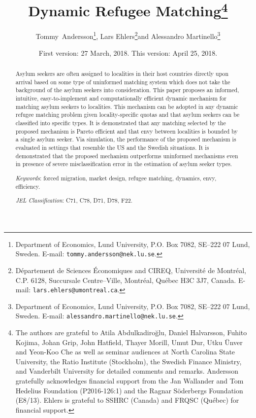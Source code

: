 \documentclass[12pt,fleqn]{article}
\begin{document}
\title{\textbf{Dynamic Refugee Matching}\footnote{The authors are grateful to Atila Abdulkadiro\u{g}lu, Daniel Halvarsson, Fuhito Kojima, Johan Grip, John Hatfield, Thayer Morill, Umut Dur, Utku \"{U}nver and Yeon-Koo Che as well as seminar audiences at North Carolina State University, the Ratio Institute (Stockholm), the Swedish Finance Ministry, and Vanderbilt University for detailed comments and remarks. Andersson gratefully acknowledges financial support from the Jan Wallander and Tom Hedelius Foundation (P2016-126:1) and the Ragnar S\"oderbergs Foundation (E8/13). Ehlers is grateful to SSHRC (Canada) and FRQSC (Qu\'{e}bec) for financial support.}}

\author{Tommy~Andersson\footnote{Department of Economics, Lund University, P.O. Box 7082, SE--222 07 Lund, Sweden. E-mail: \texttt{tommy.andersson@nek.lu.se}.}, Lars Ehlers\footnote{D\'epartement de Sciences \'Economiques and CIREQ, Universit\'e de Montr\'eal, C.P. 6128, Succursale Centre--Ville, Montr\'eal, Qu\'ebec H3C
3J7, Canada. E-mail: \texttt{lars.ehlers@umontreal.ca}.}\space\space and Alessandro Martinello\footnote{Department of Economics, Lund University, P.O. Box 7082, SE--222 07 Lund, Sweden. E-mail: \texttt{alessandro.martinello@nek.lu.se}.}}

\date{\small{First version: 27 March, 2018. This version: April 25, 2018.}}

\maketitle
\vspace*{-4mm}
\begin{abstract}
\noindent Asylum seekers are often assigned to localities in their host countries directly upon arrival based on some type of uninformed matching system which does not take the background of the asylum seekers into consideration. This paper proposes an informed, intuitive, easy-to-implement and computationally efficient dynamic mechanism for matching asylum seekers to localities. This mechanism can be adopted in any dynamic refugee matching problem given locality-specific quotas and that asylum seekers can be classified into specific types. It is demonstrated that any matching selected by the proposed mechanism is Pareto efficient and that envy between localities is bounded by a single asylum seeker. Via simulation, the performance of the proposed mechanism is evaluated in settings that resemble the US and the Swedish situations. It is demonstrated that the proposed mechanism outperforms uninformed mechanisms even in presence of severe misclassification error in the estimation of asylum seeker types.

\medskip

\noindent\emph{Keywords}: forced migration, market design, refugee matching, dynamics, envy, efficiency.

\medskip

\noindent\emph{JEL Classification}: C71, C78, D71, D78, F22.

\end{abstract}
\end{document}
